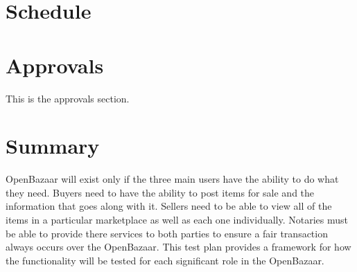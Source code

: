 \documentclass{article}
\begin{document}
\section*{Schedule}


\section*{Approvals}
This is the approvals section.

\section*{Summary}
OpenBazaar will exist only if the three main users have the ability to do what they need.
Buyers need to have the ability to post items for sale and the information that goes along with it.
Sellers need to be able to view all of the items in a particular marketplace as well as each one individually.
Notaries must be able to provide there services to both parties to ensure a fair transaction always occurs over the OpenBazaar.
This test plan provides a framework for how the functionality will be tested for each significant role in the OpenBazaar.
\end{document}
